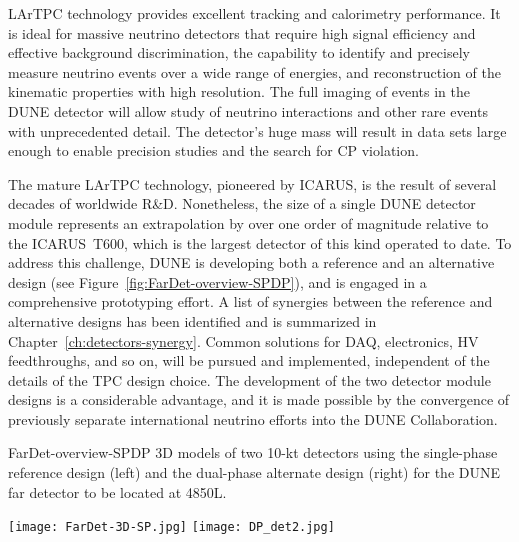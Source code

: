 LArTPC technology provides excellent tracking and calorimetry performance. It is
ideal for massive neutrino detectors that require high signal
efficiency and effective background discrimination, %
the capability to identify and precisely measure neutrino events over a
wide range of energies, and %
reconstruction of the kinematic
properties with  high resolution. The full imaging of events in the DUNE detector will
allow study of neutrino interactions and other rare events with
unprecedented detail. The detector's huge mass will %
result in data sets %
large enough to enable precision studies and the search for CP violation.

The mature LArTPC technology, pioneered by ICARUS, is the result of several decades of worldwide R\&D.
Nonetheless, the size of a single  DUNE detector module represents an
extrapolation by %
over one order of magnitude relative to  %
the ICARUS~T600, which is the largest detector of this kind operated to date. To address this challenge,
DUNE is developing both a reference and an
alternative design (see Figure~\ref{fig:FarDet-overview-SPDP}), and is engaged in a comprehensive prototyping
effort. %
A list of synergies
between the reference and alternative designs has been identified and is
summarized in Chapter~\ref{ch:detectors-synergy}. Common solutions for
DAQ, electronics, HV feedthroughs, and so on, will be pursued and
implemented, independent of the details of the TPC design choice. The development of the two detector module designs is %
a considerable advantage, and it is made possible by the %
convergence of previously separate international neutrino efforts into the DUNE Collaboration.

\begin{cdrfigure}{FarDet-overview-SPDP}
{3D models of two 10-kt detectors using the single-phase reference design (left) 
and the dual-phase alternate design (right) for the DUNE far detector to be 
located at 4850L.}
\centering
\begin{minipage}[b]{1.0\textwidth}
\begin{center}
\texttt{[image: FarDet-3D-SP.jpg]}
\texttt{[image: DP\_det2.jpg]}
\end{center}
\end{minipage}
\end{cdrfigure}

